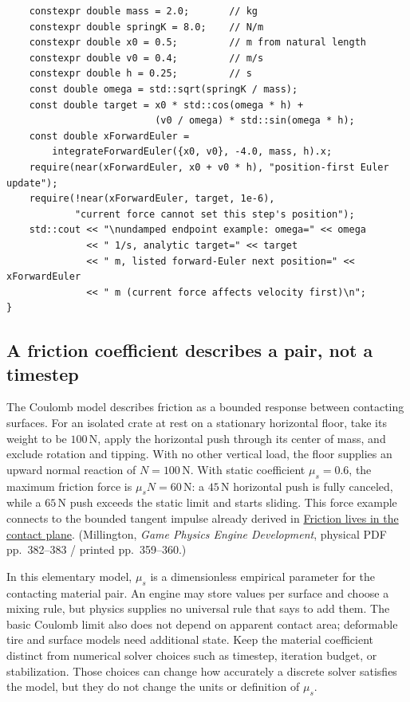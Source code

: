 \begin{verbatim}
    constexpr double mass = 2.0;       // kg
    constexpr double springK = 8.0;    // N/m
    constexpr double x0 = 0.5;         // m from natural length
    constexpr double v0 = 0.4;         // m/s
    constexpr double h = 0.25;         // s
    const double omega = std::sqrt(springK / mass);
    const double target = x0 * std::cos(omega * h) +
                          (v0 / omega) * std::sin(omega * h);
    const double xForwardEuler =
        integrateForwardEuler({x0, v0}, -4.0, mass, h).x;
    require(near(xForwardEuler, x0 + v0 * h), "position-first Euler update");
    require(!near(xForwardEuler, target, 1e-6),
            "current force cannot set this step's position");
    std::cout << "\nundamped endpoint example: omega=" << omega
              << " 1/s, analytic target=" << target
              << " m, listed forward-Euler next position=" << xForwardEuler
              << " m (current force affects velocity first)\n";
}
\end{verbatim}

\subsection{A friction coefficient describes a pair, not a timestep}\label{06-engine-ii-ch047-a-friction-coefficient-describes-a-pair-not-a-timestep}

The Coulomb model describes friction as a bounded response between contacting surfaces. For an isolated crate at rest on a stationary horizontal floor, take its weight to be \(100\,\mathrm N\), apply the horizontal push through its center of mass, and exclude rotation and tipping. With no other vertical load, the floor supplies an upward normal reaction of \(N=100\,\mathrm N\). With static coefficient \(\mu_s=0.6\), the maximum friction force is \(\mu_sN=60\,\mathrm N\): a \(45\,\mathrm N\) horizontal push is fully canceled, while a \(65\,\mathrm N\) push exceeds the static limit and starts sliding. This force example connects to the bounded tangent impulse already derived in \hyperref[06-engine-ii-ch033-friction-lives-in-the-contact-plane]{Friction lives in the contact plane}. (Millington, \emph{Game Physics Engine Development}, physical PDF pp.~382--383 / printed pp.~359--360.)

In this elementary model, \(\mu_s\) is a dimensionless empirical parameter for the contacting material pair. An engine may store values per surface and choose a mixing rule, but physics supplies no universal rule that says to add them. The basic Coulomb limit also does not depend on apparent contact area; deformable tire and surface models need additional state. Keep the material coefficient distinct from numerical solver choices such as timestep, iteration budget, or stabilization. Those choices can change how accurately a discrete solver satisfies the model, but they do not change the units or definition of \(\mu_s\).


